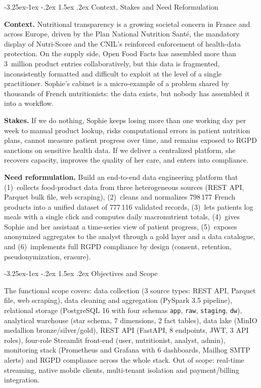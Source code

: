 \documentclass[a4paper,11pt,oneside,openany]{report}
\makeatletter
\renewcommand\subsubsection{\@startsection{subsubsection}{3}{\z@}%
  {-3.25ex\@plus -1ex \@minus -.2ex}%
  {1.5ex \@plus .2ex}%
  {\normalfont\normalsize\bfseries\color{ntblue}}}
\newcommand{\off}{Open Food Facts}
\newcommand{\rgpd}{RGPD}
\makeatother
\begin{document}
\subsubsection{Context, Stakes and Need Reformulation}

\textbf{Context.} Nutritional transparency is a growing societal
concern in France and across Europe, driven by the Plan National
Nutrition Sant\'{e}, the mandatory display of Nutri-Score and the
CNIL's reinforced enforcement of health-data protection. On the
supply side, \off{} has assembled more than 3~million product
entries collaboratively, but this data is fragmented, inconsistently
formatted and difficult to exploit at the level of a single
practitioner. Sophie's cabinet is a micro-example of a problem
shared by thousands of French nutritionists: the data exists, but
nobody has assembled it into a workflow.

\textbf{Stakes.} If we do nothing, Sophie keeps losing more than one
working day per week to manual product lookup, risks computational
errors in patient nutrition plans, cannot measure patient progress
over time, and remains exposed to \rgpd{} sanctions on sensitive
health data. If we deliver a centralized platform, she recovers
capacity, improves the quality of her care, and enters into
compliance.

\textbf{Need reformulation.} Build an end-to-end data engineering
platform that (1)~collects food-product data from three
heterogeneous sources (REST API, Parquet bulk file, web scraping),
(2)~cleans and normalizes 798\,177 French products into a unified
dataset of 777\,116 validated records,
(3)~lets patients log meals with a single click and computes daily
macronutrient totals, (4)~gives Sophie and her assistant a
time-series view of patient progress, (5)~exposes anonymized
aggregates to the analyst through a gold layer and a data
catalogue, and (6)~implements full \rgpd{} compliance by design
(consent, retention, pseudonymization, erasure).

\subsubsection{Objectives and Scope}

The functional scope covers: data collection (3 source types: REST API, Parquet file, web scraping), data
cleaning and aggregation (PySpark 3.5 pipeline), relational storage
(PostgreSQL 16 with four schemas \texttt{app}, \texttt{raw},
\texttt{staging}, \texttt{dw}), analytical warehouse (star schema,
7 dimensions, 2 fact tables), data lake (MinIO medallion
bronze/silver/gold), REST API (FastAPI, 8 endpoints, JWT, 3 API
roles), four-role Streamlit front-end (user, nutritionist, analyst,
admin), monitoring stack (Prometheus and Grafana with 6 dashboards,
Mailhog SMTP alerts) and \rgpd{} compliance across the whole stack.
Out of scope: real-time streaming, native mobile clients,
multi-tenant isolation and payment/billing integration.
\end{document}
